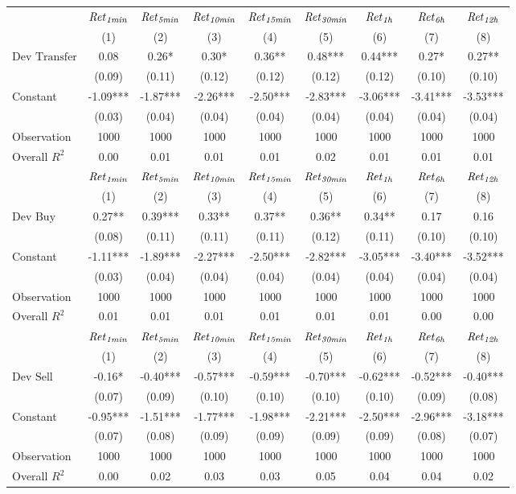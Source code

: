 \begin{tabular}{lcccccccc}
\hline
 & ${\it Ret}_{\it 1min}$ & ${\it Ret}_{\it 5min}$ & ${\it Ret}_{\it 10min}$ & ${\it Ret}_{\it 15min}$ & ${\it Ret}_{\it 30min}$ & ${\it Ret}_{\it 1h}$ & ${\it Ret}_{\it 6h}$ & ${\it Ret}_{\it 12h}$ \\
 & (1) & (2) & (3) & (4) & (5) & (6) & (7) & (8) \\
\hline
$\text{Dev Transfer}$ & 0.08 & 0.26* & 0.30* & 0.36** & 0.48*** & 0.44*** & 0.27* & 0.27** \\
 & (0.09) & (0.11) & (0.12) & (0.12) & (0.12) & (0.12) & (0.10) & (0.10) \\
Constant & -1.09*** & -1.87*** & -2.26*** & -2.50*** & -2.83*** & -3.06*** & -3.41*** & -3.53*** \\
 & (0.03) & (0.04) & (0.04) & (0.04) & (0.04) & (0.04) & (0.04) & (0.04) \\
Observation & 1000 & 1000 & 1000 & 1000 & 1000 & 1000 & 1000 & 1000 \\
Overall $R^2$ & 0.00 & 0.01 & 0.01 & 0.01 & 0.02 & 0.01 & 0.01 & 0.01 \\
\hline
 & ${\it Ret}_{\it 1min}$ & ${\it Ret}_{\it 5min}$ & ${\it Ret}_{\it 10min}$ & ${\it Ret}_{\it 15min}$ & ${\it Ret}_{\it 30min}$ & ${\it Ret}_{\it 1h}$ & ${\it Ret}_{\it 6h}$ & ${\it Ret}_{\it 12h}$ \\
 & (1) & (2) & (3) & (4) & (5) & (6) & (7) & (8) \\
\hline
$\text{Dev Buy}$ & 0.27** & 0.39*** & 0.33** & 0.37** & 0.36** & 0.34** & 0.17 & 0.16 \\
 & (0.08) & (0.11) & (0.11) & (0.11) & (0.12) & (0.11) & (0.10) & (0.10) \\
Constant & -1.11*** & -1.89*** & -2.27*** & -2.50*** & -2.82*** & -3.05*** & -3.40*** & -3.52*** \\
 & (0.03) & (0.04) & (0.04) & (0.04) & (0.04) & (0.04) & (0.04) & (0.04) \\
Observation & 1000 & 1000 & 1000 & 1000 & 1000 & 1000 & 1000 & 1000 \\
Overall $R^2$ & 0.01 & 0.01 & 0.01 & 0.01 & 0.01 & 0.01 & 0.00 & 0.00 \\
\hline
 & ${\it Ret}_{\it 1min}$ & ${\it Ret}_{\it 5min}$ & ${\it Ret}_{\it 10min}$ & ${\it Ret}_{\it 15min}$ & ${\it Ret}_{\it 30min}$ & ${\it Ret}_{\it 1h}$ & ${\it Ret}_{\it 6h}$ & ${\it Ret}_{\it 12h}$ \\
 & (1) & (2) & (3) & (4) & (5) & (6) & (7) & (8) \\
\hline
$\text{Dev Sell}$ & -0.16* & -0.40*** & -0.57*** & -0.59*** & -0.70*** & -0.62*** & -0.52*** & -0.40*** \\
 & (0.07) & (0.09) & (0.10) & (0.10) & (0.10) & (0.10) & (0.09) & (0.08) \\
Constant & -0.95*** & -1.51*** & -1.77*** & -1.98*** & -2.21*** & -2.50*** & -2.96*** & -3.18*** \\
 & (0.07) & (0.08) & (0.09) & (0.09) & (0.09) & (0.09) & (0.08) & (0.07) \\
Observation & 1000 & 1000 & 1000 & 1000 & 1000 & 1000 & 1000 & 1000 \\
Overall $R^2$ & 0.00 & 0.02 & 0.03 & 0.03 & 0.05 & 0.04 & 0.04 & 0.02 \\
\hline
\end{tabular}
